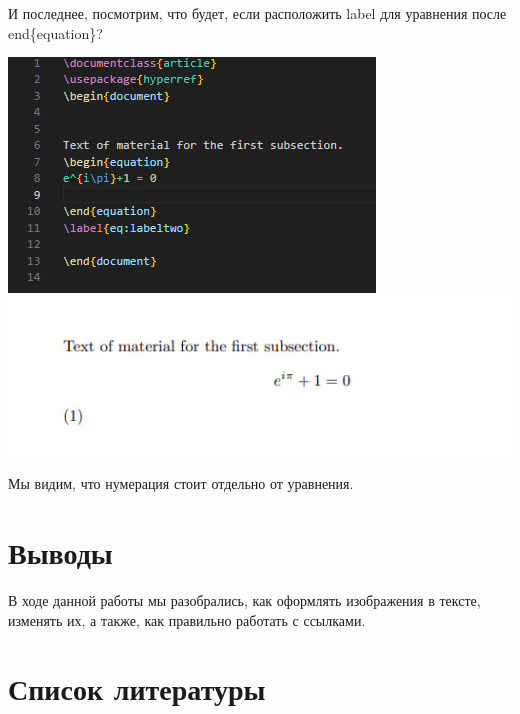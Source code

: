 \documentclass[
  english,
  russian,
  12pt,
  a4paper,
  DIV=11,
  numbers=noendperiod]{scrreprt}
\begin{document}
И последнее, посмотрим, что будет, если расположить label для уравнения
после end\{equation\}?

\includegraphics[width=0.7\linewidth,height=\textheight,keepaspectratio]{image/33.jpg}
\includegraphics[width=0.7\linewidth,height=\textheight,keepaspectratio]{image/34.jpg}

Мы видим, что нумерация стоит отдельно от уравнения.

\chapter{Выводы}\label{ux432ux44bux432ux43eux434ux44b}

В ходе данной работы мы разобрались, как оформлять изображения в тексте,
изменять их, а также, как правильно работать с ссылками.

\chapter*{Список
литературы}\label{ux441ux43fux438ux441ux43eux43a-ux43bux438ux442ux435ux440ux430ux442ux443ux440ux44b}

\printbibliography[heading=none]
\end{document}
